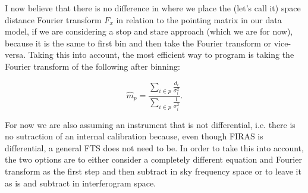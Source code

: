\documentclass{article}
\begin{document}
I now believe that there is no difference in where we place the (let's call it) space distance Fourier transform $F_x$ in relation to the pointing matrix in our data model, if we are considering a stop and stare approach (which we are for now), because it is the same to first bin and then take the Fourier transform or vice-versa. Taking this into account, the most efficient way to program is taking the Fourier transform of the following after binning:

\begin{equation}
	\hat m_p = \frac{\sum_{i \in p}\frac{d_i}{\sigma_i^2}}{\sum_{i \in p}\frac{1}{\sigma_i^2}}.
\end{equation}

For now we are also assuming an instrument that is not differential, i.e. there is no sutraction of an internal calibration because, even though FIRAS is differential, a general FTS does not need to be. In order to take this into account, the two options are to either consider a completely different equation and Fourier transform as the first step and then subtract in sky frequency space or to leave it as is and subtract in interferogram space.

%



\end{document}

